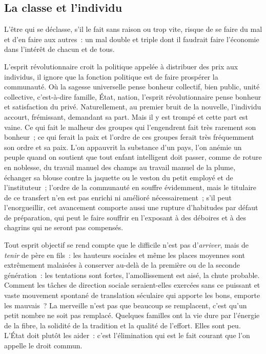 \documentclass[french,twoside]{book} %
\begin{document}
\subsection[{La classe et l’individu}]{La classe et l’individu}
\noindent L’être qui se déclasse, s’il le fait sans raison ou trop vite, risque de se faire du mal et d’en faire aux autres : un mal double et triple dont il faudrait faire l’économie dans l’intérêt de chacun et de tous.\par
L’esprit révolutionnaire croit la politique appelée à distribuer des prix aux individus, il ignore que la fonction politique est de faire prospérer la communauté. Où la sagesse universelle pense bonheur collectif, bien public, unité collective, c’est-à-dire famille, État, nation, l’esprit révolutionnaire pense bonheur et satisfaction du privé. Naturellement, au premier bruit de la nouvelle, l’individu accourt, frémissant, demandant sa part. Mais il y est trompé et cette part est vaine. Ce qui fait le malheur des groupes qui l’engendrent fait très rarement son bonheur ; ce qui ferait la paix et l’ordre de ces groupes ferait très fréquemment son ordre et sa paix. L’on appauvrit la substance d’un pays, l’on anémie un peuple quand on soutient que tout enfant intelligent doit passer, comme de roture en noblesse, du travail manuel des champs au travail manuel de la plume, échanger sa blouse contre la jaquette ou le veston du petit employé et de l’instituteur ; l’ordre de la communauté en souffre évidemment, mais le titulaire de ce transfert n’en est pas enrichi ni amélioré nécessairement ; s’il peut l’enorgueillir, cet avancement comporte aussi une rupture d’habitudes par défaut de préparation, qui peut le faire souffrir en l’exposant à des déboires et à des chagrins qui ne seront pas compensés.\par
Tout esprit objectif se rend compte que le difficile n’est pas d’\emph{arriver}, mais de \emph{tenir} de père en fils : les hauteurs sociales et même les places moyennes sont extrêmement malaisées à conserver au-delà de la première ou de la seconde génération : les tentations sont fortes, l’amollissement est aisé, la chute probable. Comment les tâches de direction sociale seraient-elles exercées sans ce puissant et vaste mouvement spontané de translation séculaire qui apporte les bons, emporte les mauvais ? La merveille n’est pas que beaucoup se remplacent, c’est qu’un petit nombre ne soit pas remplacé. Quelques familles ont la vie dure par l’énergie de la fibre, la solidité de la tradition et la qualité de l’effort. Elles sont peu. L’État doit plutôt les aider : c’est l’élimination qui est le fait courant que l’on appelle le droit commun.\par
\end{document}
